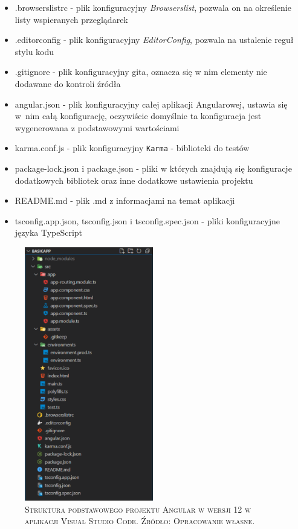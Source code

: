 \documentclass[12pt,a4paper,oneside]{book}
\newcommand{\captionT}[1]{\caption{\textsc{\footnotesize{#1}}}}
\begin{document}
\begin{itemize}
  \item .browserslistrc - plik konfiguracyjny \textit{Browserslist}, pozwala on na określenie listy wspieranych przeglądarek
  \item .editorconfig - plik konfiguracyjny \textit{EditorConfig}, pozwala na ustalenie reguł stylu kodu
  \item .gitignore - plik konfiguracyjny gita, oznacza się w nim elementy nie dodawane do kontroli źródła
  \item angular.json - plik konfiguracyjny całej aplikacji Angularowej, ustawia się w~nim całą konfigurację, oczywiście domyślnie ta konfiguracja jest wygenerowana z podstawowymi wartościami
  \item karma.conf.js - plik konfiguracyjny \texttt{Karma} - biblioteki do testów
  \item package-lock.json i package.json - pliki w których znajdują się konfiguracje dodatkowych bibliotek oraz inne dodatkowe ustawienia projektu
  \item README.md - plik .md z informacjami na temat aplikacji
  \item tsconfig.app.json, tsconfig.json i tsconfig.spec.json - pliki konfiguracyjne języka TypeScript 
\end{itemize}

\begin{figure}[H]
\centering
\includegraphics[width=0.5\textwidth]{images/BasicAppAngular.pdf}
\captionT{Struktura podstawowego projektu Angular w wersji 12 w aplikacji Visual Studio Code. Źródło: Opracowanie własne.}
\label{rys_basic_app_angular}
\end{figure}
\end{document}

